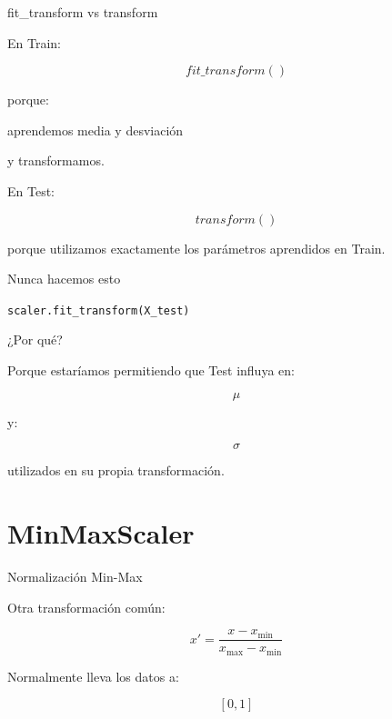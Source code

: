 \documentclass[aspectratio=169,11pt]{beamer}
\begin{document}

\begin{frame}{fit\_transform vs transform}

En Train:

\[
\boxed{
fit\_transform()
}
\]

porque:

\begin{center}

aprendemos media y desviación
\end{center}

y transformamos.

En Test:

\[
\boxed{
transform()
}
\]

porque utilizamos exactamente los parámetros aprendidos en Train.

\end{frame}


\begin{frame}{Nunca hacemos esto}

\begin{center}

\Large
\texttt{scaler.fit\_transform(X\_test)}
\end{center}

\vspace{0.5cm}

¿Por qué?

Porque estaríamos permitiendo que Test influya en:

\[
\mu
\]

y:

\[
\sigma
\]

utilizados en su propia transformación.

\end{frame}

\section{MinMaxScaler}

\begin{frame}{Normalización Min-Max}

Otra transformación común:

\[
x'
=
\frac{
x-x_{\min}
}{
x_{\max}-x_{\min}
}
\]

Normalmente lleva los datos a:

\[
[0,1]
\]

\end{frame}
\end{document}
